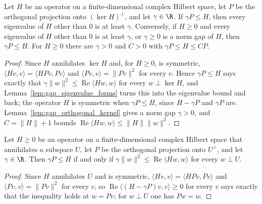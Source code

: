 \begin{lemma}
    \label{lem:gap_operator_form}
    \leanok
    Let $H$ be an operator on a finite-dimensional complex Hilbert space, let $P$ be the
    orthogonal projection onto $(\ker H)^\perp$, and let $\gamma\in\R$. If
    $\gamma P\le H$, then every eigenvalue of $H$ other than $0$ is at least $\gamma$.
    Conversely, if $H\ge0$ and every eigenvalue of $H$ other than $0$ is at least
    $\gamma$, or $\gamma\ge0$ is a norm gap of $H$, then $\gamma P\le H$. For $H\ge0$
    there are $\gamma>0$ and $C>0$ with $\gamma P\le H\le CP$.
\end{lemma}
\begin{proof}\leanok
    Since $H$ annihilates $\ker H$ and, for $H\ge0$, is symmetric,
    $\langle Hv,v\rangle=\langle HPv,Pv\rangle$ and
    $\langle Pv,v\rangle=\lVert Pv\rVert^2$ for every $v$. Hence $\gamma P\le H$ says
    exactly that $\gamma\lVert w\rVert^2\le\operatorname{Re}\langle Hw,w\rangle$ for
    every $w\perp\ker H$, and Lemma~\ref{lem:gap_eigenvalue_forms} turns this into the
    eigenvalue bound and back; the operator $H$ is symmetric when $\gamma P\le H$, since
    $H-\gamma P$ and $\gamma P$ are. Lemma~\ref{lem:gap_orthogonal_kernel} gives a norm
    gap $\gamma>0$, and $C=\lVert H\rVert+1$ bounds
    $\operatorname{Re}\langle Hw,w\rangle\le\lVert H\rVert\lVert w\rVert^2$.
\end{proof}

\begin{lemma}
    \label{lem:gap_operator_form_subspace}
    \leanok
    Let $H\ge0$ be an operator on a finite-dimensional complex Hilbert space that
    annihilates a subspace $U$, let $P$ be the orthogonal projection onto $U^\perp$,
    and let $\gamma\in\R$. Then $\gamma P\le H$ if and only if
    $\gamma\lVert w\rVert^2\le\operatorname{Re}\langle Hw,w\rangle$ for every
    $w\perp U$.
\end{lemma}
\begin{proof}\leanok
    Since $H$ annihilates $U$ and is symmetric, $\langle Hv,v\rangle=\langle HPv,Pv\rangle$
    and $\langle Pv,v\rangle=\lVert Pv\rVert^2$ for every $v$, so
    $\operatorname{Re}\langle(H-\gamma P)v,v\rangle\ge0$ for every $v$ says exactly
    that the inequality holds at $w=Pv$; for $w\perp U$ one has $Pw=w$.
\end{proof}

